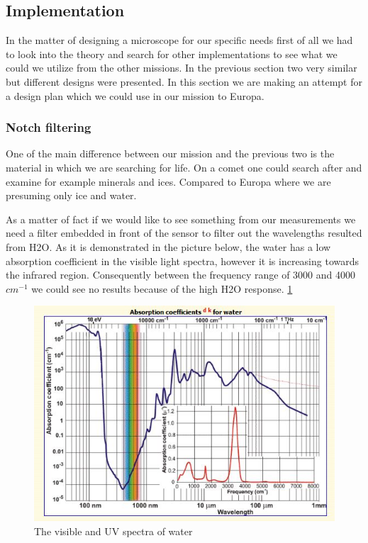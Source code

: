 \subsection{Implementation}
In the matter of designing a microscope for our specific needs first of all we had to look into the theory and search for other implementations to see what we could we utilize from the other missions. In the previous section two very similar but different designs were presented. In this section we are making an attempt for a design plan which we could use in our mission to Europa.

\subsubsection{Notch filtering}

One of the main difference between our mission and the previous two is the material in which we are searching for life. On a comet one could search after and examine for example minerals and ices. Compared to Europa where we are presuming only ice and water.

As a matter of fact if we would like to see something from our measurements we need a filter embedded in front of the sensor to filter out the wavelengths resulted from H2O. As it is demonstrated in the picture below, the water has a low absorption coefficient in the visible light spectra, however it is increasing towards the infrared region. Consequently between the frequency range of 3000 and 4000 $cm^{-1}$ we could see no results because of the high H2O response.
\ref{fig:Absorption_coeff_water}

\begin{figure}[htb]
  \centering
  \includegraphics[scale=0.7]{figures/BFfig/Absorption_coeff_water}
  \caption{The visible and UV spectra of water}
  \label{fig:Absorption_coeff_water}
\end{figure}

